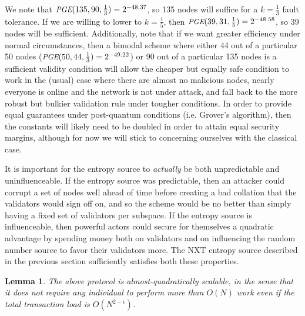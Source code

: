 \documentclass[11pt,a4paper]{article}
\makeatletter
\theoremstyle{plain}
\newtheorem{lem}[thm]{Lemma}
\theoremstyle{definition}
\theoremstyle{remark}
\newcommand{\ie}{i.e.\@\xspace}
\newcommand{\makeintoafunction}[1]{\textit{\uppercase{\small #1}}}
\newcommand{\PGE}{\makeintoafunction{pge}}
\makeatother
\begin{document}
We note that $\PGE(135, 90, \frac{1}{3}) = 2^{-48.37}$, so 135 nodes will suffice for a $k = \frac{1}{3}$ fault tolerance. If we are willing to lower to $k = \frac{1}{5}$, then $\PGE(39, 31, \frac{1}{5}) = 2^{-48.58}$, so 39 nodes will be sufficient. Additionally, note that if we want greater efficiency under normal circumstances, then a bimodal scheme where either 44 out of a particular 50 nodes ($\PGE(50, 44, \frac{1}{3}) = 2^{-49.22}$) or 90 out of a particular 135 nodes is a sufficient validity condition will allow the cheaper but equally safe condition to work in the (usual) case where there are almost no malicious nodes, nearly everyone is online and the network is not under attack, and fall back to the more robust but bulkier validation rule under tougher conditions. In order to provide equal guarantees under post-quantum conditions (\ie Grover's algorithm), then the constants will likely need to be doubled in order to attain equal security margins, although for now we will stick to concerning ourselves with the classical case.

It is important for the entropy source to \emph{actually} be both unpredictable and uninfluenceable. If the entropy source was predictable, then an attacker could corrupt a set of nodes well ahead of time before creating a bad collation that the validators would sign off on, and so the scheme would be no better than simply having a fixed set of validators per subspace. If the entropy source is influenceable, then powerful actors could secure for themselves a quadratic advantage by spending money both on validators and on influencing the random number source to favor their validators more. The NXT entropy source described in the previous section sufficiently satisfies both these properties.

\begin{lem}
The above protocol is almost-quadratically scalable, in the sense that it does not require any individual to perform more than $O(N)$ work even if the total transaction load is $O(N^{2-\epsilon})$.
\end{lem}
\end{document}
